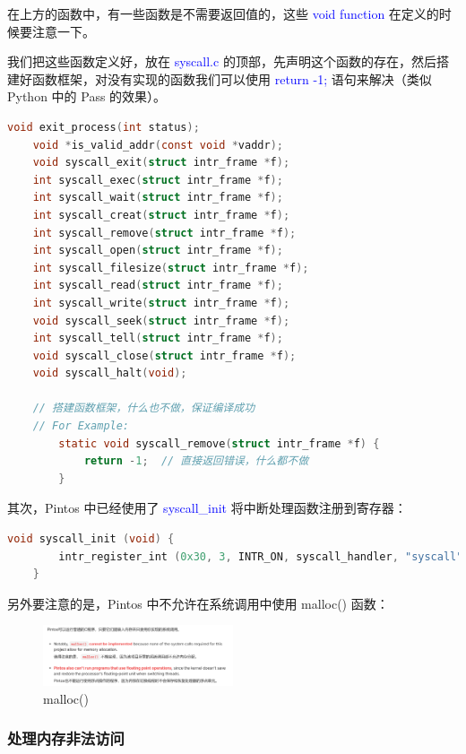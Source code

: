 \documentclass[14pt,a4paper,UTF8,twoside]{article}
\renewcommand{\texttt}[1]{\textcolor{blue}{\ttfamily #1}}
\begin{document}
在上方的函数中，有一些函数是不需要返回值的，这些 \texttt{void function} 在定义的时候要注意一下。

我们把这些函数定义好，放在 \texttt{syscall.c} 的顶部，先声明这个函数的存在，然后搭建好函数框架，对没有实现的函数我们可以使用 \texttt{return -1;} 语句来解决（类似 Python 中的 Pass 的效果）。

\begin{lstlisting}[language=C]
    void exit_process(int status);
    void *is_valid_addr(const void *vaddr);
    void syscall_exit(struct intr_frame *f);
    int syscall_exec(struct intr_frame *f);
    int syscall_wait(struct intr_frame *f);
    int syscall_creat(struct intr_frame *f);
    int syscall_remove(struct intr_frame *f);
    int syscall_open(struct intr_frame *f);
    int syscall_filesize(struct intr_frame *f);
    int syscall_read(struct intr_frame *f);
    int syscall_write(struct intr_frame *f);
    void syscall_seek(struct intr_frame *f);
    int syscall_tell(struct intr_frame *f);
    void syscall_close(struct intr_frame *f);
    void syscall_halt(void);
    
    // 搭建函数框架，什么也不做，保证编译成功
    // For Example:
        static void syscall_remove(struct intr_frame *f) {
            return -1;  // 直接返回错误，什么都不做
        }
\end{lstlisting}

其次，Pintos 中已经使用了 \texttt{syscall\_init} 将中断处理函数注册到寄存器：

\begin{lstlisting}[language=C, title= init.c]
    void syscall_init (void) {
        intr_register_int (0x30, 3, INTR_ON, syscall_handler, "syscall");
    }
\end{lstlisting}

另外要注意的是，Pintos 中不允许在系统调用中使用 malloc() 函数：

\begin{figure}[H]
    \centering
    \includegraphics[width=0.5\textwidth]{img5/warning.png}
    \caption{malloc()}
    \label{fig:malloc}
\end{figure}

\subsubsection{处理内存非法访问}
\end{document}
